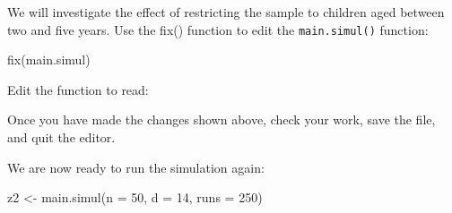 \documentclass[
  12pt,
  a4paper]{book}
\newenvironment{Shaded}{\begin{snugshade}}{\end{snugshade}}
\newcommand{\AttributeTok}[1]{\textcolor[rgb]{0.77,0.63,0.00}{#1}}
\newcommand{\ConstantTok}[1]{\textcolor[rgb]{0.00,0.00,0.00}{#1}}
\newcommand{\ControlFlowTok}[1]{\textcolor[rgb]{0.13,0.29,0.53}{\textbf{#1}}}
\newcommand{\DecValTok}[1]{\textcolor[rgb]{0.00,0.00,0.81}{#1}}
\newcommand{\FunctionTok}[1]{\textcolor[rgb]{0.00,0.00,0.00}{#1}}
\newcommand{\NormalTok}[1]{#1}
\newcommand{\OtherTok}[1]{\textcolor[rgb]{0.56,0.35,0.01}{#1}}
\newcommand{\SpecialCharTok}[1]{\textcolor[rgb]{0.00,0.00,0.00}{#1}}
\newcommand{\StringTok}[1]{\textcolor[rgb]{0.31,0.60,0.02}{#1}}
\begin{document}
We will investigate the effect of restricting the sample to children aged between two and five years. Use the fix() function to edit the \texttt{main.simul()} function:

\begin{Shaded}
\begin{Highlighting}[]
\FunctionTok{fix}\NormalTok{(main.simul)}
\end{Highlighting}
\end{Shaded}

Edit the function to read:

\begin{Shaded}
\end{Shaded}

Once you have made the changes shown above, check your work, save the file, and quit the editor.

We are now ready to run the simulation again:

\begin{Shaded}
\begin{Highlighting}[]
\NormalTok{z2 }\OtherTok{\textless{}{-}} \FunctionTok{main.simul}\NormalTok{(}\AttributeTok{n =} \DecValTok{50}\NormalTok{, }\AttributeTok{d =} \DecValTok{14}\NormalTok{, }\AttributeTok{runs =} \DecValTok{250}\NormalTok{)}
\end{Highlighting}
\end{Shaded}
\end{document}
